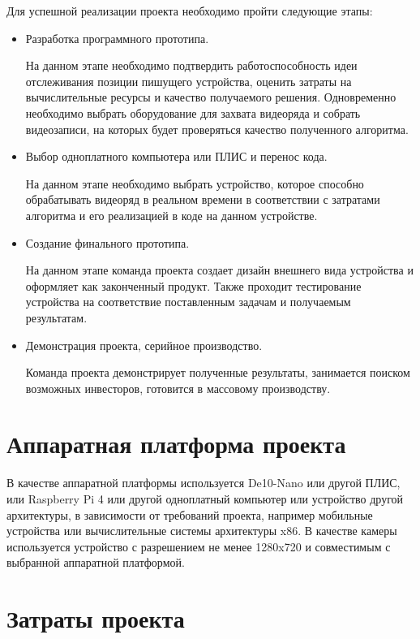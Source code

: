 \documentclass[a4paper,14pt]{article}
\begin{document}
Для успешной реализации проекта необходимо пройти следующие этапы:

\begin{itemize}
	\item Разработка программного прототипа.

	На данном этапе необходимо подтвердить работоспособность идеи отслеживания позиции пишущего устройства, оценить затраты на вычислительные ресурсы и качество получаемого решения.
	Одновременно необходимо выбрать оборудование для захвата видеоряда и собрать видеозаписи, на которых будет проверяться качество полученного алгоритма.
	
	\item Выбор одноплатного компьютера или ПЛИС и перенос кода.
	
	На данном этапе необходимо выбрать устройство, которое способно обрабатывать видеоряд в реальном времени в соответствии с затратами алгоритма и его реализацией в коде на данном устройстве.
	
	\item Создание финального прототипа.
	
	На данном этапе команда проекта создает дизайн внешнего вида устройства и оформляет как законченный продукт. 
	Также проходит тестирование устройства на соответствие поставленным задачам и получаемым результатам.
	
	\item Демонстрация проекта, серийное производство.
	
	Команда проекта демонстрирует полученные результаты, занимается поиском возможных инвесторов, готовится в массовому производству.
	
\end{itemize}

\section{Аппаратная платформа проекта}

В качестве аппаратной платформы используется De10-Nano или другой ПЛИС, или Raspberry Pi 4 или другой одноплатный компьютер или устройство другой архитектуры, в зависимости от требований проекта, например мобильные устройства или вычислительные системы архитектуры x86.
В качестве камеры используется устройство с разрешением не менее 1280x720 и совместимым с выбранной аппаратной платформой.

\section{Затраты проекта}
\end{document}
